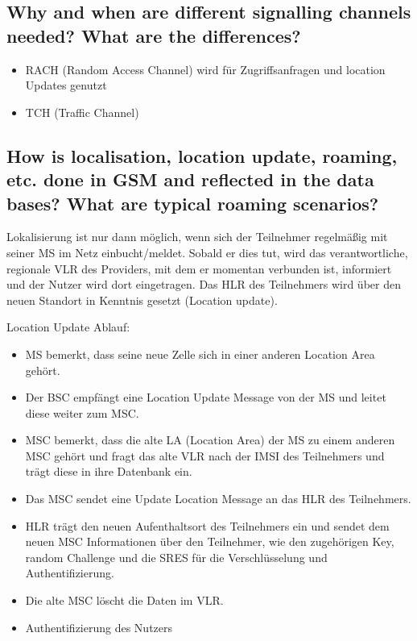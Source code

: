 \subsection{Why and when are different signalling channels needed? What are the differences?}
\begin{itemize}
\item RACH (Random Access Channel) wird für Zugriffsanfragen und location Updates genutzt

\item TCH (Traffic Channel)

\end{itemize}

\subsection{How is localisation, location update, roaming, etc. done in GSM and reflected in the data bases? What are typical roaming scenarios?}
Lokalisierung ist nur dann möglich, wenn sich der Teilnehmer regelmäßig mit seiner MS im Netz einbucht/meldet. Sobald er dies tut, wird das verantwortliche, regionale VLR des Providers, mit dem er momentan verbunden ist, informiert und der Nutzer wird dort eingetragen. Das HLR des Teilnehmers wird über den neuen Standort in Kenntnis gesetzt (Location update).


Location Update Ablauf:

\begin{itemize}
\item MS bemerkt, dass seine neue Zelle sich in einer anderen Location Area gehört.
\item Der BSC empfängt eine Location Update Message von der MS und leitet diese weiter zum MSC.
\item MSC bemerkt, dass die alte LA (Location Area) der MS zu einem anderen MSC gehört und fragt das alte VLR nach der IMSI des Teilnehmers und trägt diese in ihre Datenbank ein.
\item Das MSC sendet eine Update Location Message an das HLR des Teilnehmers. 
\item HLR trägt den neuen Aufenthaltsort des Teilnehmers ein und sendet dem neuen MSC Informationen über den Teilnehmer, wie den zugehörigen Key, random Challenge und die SRES für die Verschlüsselung und Authentifizierung.
\item Die alte MSC löscht die Daten im VLR.
\item Authentifizierung des Nutzers
\end{itemize} 



